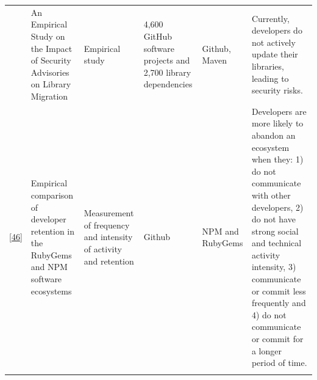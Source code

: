 \documentclass[]{book}
\begin{document}
\begin{longtable}[]{@{}llllll@{}}
\begin{minipage}[t]{0.10\columnwidth}
\end{minipage} & \begin{minipage}[t]{0.18\columnwidth}\raggedright\strut
An Empirical Study on the Impact of Security Advisories on Library
Migration\strut
\end{minipage} & \begin{minipage}[t]{0.19\columnwidth}\raggedright\strut
Empirical study\strut
\end{minipage} & \begin{minipage}[t]{0.11\columnwidth}\raggedright\strut
4,600 GitHub software projects and 2,700 library dependencies\strut
\end{minipage} & \begin{minipage}[t]{0.13\columnwidth}\raggedright\strut
Github, Maven\strut
\end{minipage} & \begin{minipage}[t]{0.11\columnwidth}\raggedright\strut
Currently, developers do not actively update their libraries, leading to
security risks.\strut
\end{minipage}\tabularnewline
\begin{minipage}[t]{0.10\columnwidth}\raggedright\strut
{[}\protect\hyperlink{ref-Constantinou2017}{46}{]}\strut
\end{minipage} & \begin{minipage}[t]{0.18\columnwidth}\raggedright\strut
Empirical comparison of developer retention in the RubyGems and NPM
software ecosystems\strut
\end{minipage} & \begin{minipage}[t]{0.19\columnwidth}\raggedright\strut
Measurement of frequency and intensity of activity and retention\strut
\end{minipage} & \begin{minipage}[t]{0.11\columnwidth}\raggedright\strut
Github\strut
\end{minipage} & \begin{minipage}[t]{0.13\columnwidth}\raggedright\strut
NPM and RubyGems\strut
\end{minipage} & \begin{minipage}[t]{0.11\columnwidth}\raggedright\strut
Developers are more likely to abandon an ecosystem when they: 1) do not
communicate with other developers, 2) do not have strong social and
technical activity intensity, 3) communicate or commit less frequently
and 4) do not communicate or commit for a longer period of time.\strut
\end{minipage}\tabularnewline
\begin{minipage}[t]{0.10\columnwidth}\raggedright\strut

\end{minipage}
\end{longtable}
\end{document}
